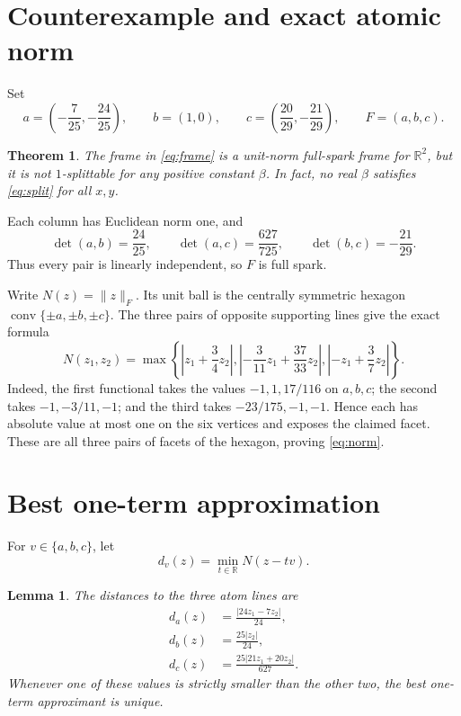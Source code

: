 \documentclass[11pt]{article}
\newtheorem{theorem}{Theorem}
\newtheorem{lemma}{Lemma}
\newcommand{\R}{\mathbb R}
\newcommand{\conv}{\operatorname{conv}}
\begin{document}
\section{Counterexample and exact atomic norm}

Set
\begin{equation}\label{eq:frame}
 a=\left(-\frac7{25},-\frac{24}{25}\right),\qquad
 b=(1,0),\qquad
 c=\left(\frac{20}{29},-\frac{21}{29}\right),
 \qquad F=(a,b,c).
\end{equation}

\begin{theorem}\label{thm:main}
The frame in \eqref{eq:frame} is a unit-norm full-spark frame for $\R^2$, but
it is not $1$-splittable for any positive constant $\beta$. In fact, no real
$\beta$ satisfies \eqref{eq:split} for all $x,y$.
\end{theorem}

Each column has Euclidean norm one, and
\[
 \det(a,b)=\frac{24}{25},\qquad
 \det(a,c)=\frac{627}{725},\qquad
 \det(b,c)=-\frac{21}{29}.
\]
Thus every pair is linearly independent, so $F$ is full spark.

Write $N(z)=\|z\|_F$. Its unit ball is the centrally symmetric hexagon
$\conv\{\pm a,\pm b,\pm c\}$. The three pairs of opposite supporting lines
give the exact formula
\begin{equation}\label{eq:norm}
 N(z_1,z_2)=\max\left\{
 \left|z_1+\frac34z_2\right|,
 \left|-\frac3{11}z_1+\frac{37}{33}z_2\right|,
 \left|-z_1+\frac37z_2\right|
 \right\}.
\end{equation}
Indeed, the first functional takes the values $-1,1,17/116$ on $a,b,c$;
the second takes $-1,-3/11,-1$; and the third takes $-23/175,-1,-1$.
Hence each has absolute value at most one on the six vertices and exposes the
claimed facet. These are all three pairs of facets of the hexagon, proving
\eqref{eq:norm}.

\section{Best one-term approximation}

For $v\in\{a,b,c\}$, let
\[
 d_v(z)=\min_{t\in\R}N(z-tv).
\]

\begin{lemma}\label{lem:distances}
The distances to the three atom lines are
\begin{align}
 d_a(z)&=\frac{|24z_1-7z_2|}{24},\label{eq:da}\\
 d_b(z)&=\frac{25|z_2|}{24},\label{eq:db}\\
 d_c(z)&=\frac{25|21z_1+20z_2|}{627}.\label{eq:dc}
\end{align}
Whenever one of these values is strictly smaller than the other two, the best
one-term approximant is unique.
\end{lemma}
\end{document}
